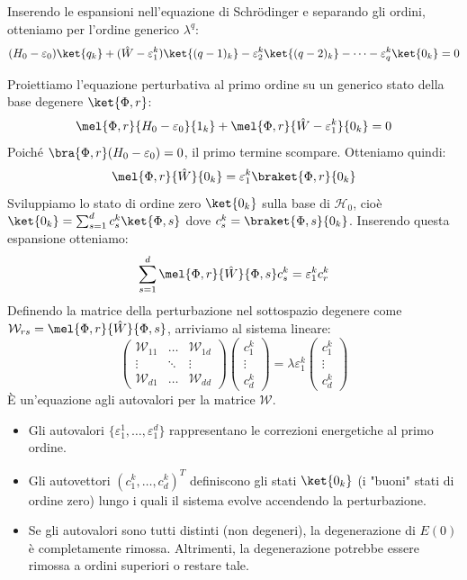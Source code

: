 Inserendo le espansioni nell'equazione di Schrödinger e separando gli ordini, otteniamo per l'ordine generico $\lambda^q$:
\[
    (H_0 - \varepsilon_0)\ket{q_k} + (\hat{W} - \varepsilon_1^k)\ket{(q-1)_k} - \varepsilon_2^k\ket{(q-2)_k} - \dots - \varepsilon_q^k \ket{0_k} = 0
\]

Proiettiamo l'equazione perturbativa al primo ordine su un generico stato della base degenere $\ket{\Phi, r}$:
\[
    \mel{\Phi,r}{H_0 - \varepsilon_0}{1_k} + \mel{\Phi,r}{\hat{W} - \varepsilon_1^k}{0_k} = 0
\]
Poiché $\bra{\Phi,r}(H_0 - \varepsilon_0) = 0$, il primo termine scompare. Otteniamo quindi:
\[
    \mel{\Phi,r}{\hat{W}}{0_k} = \varepsilon_1^k \braket{\Phi,r}{0_k}
\]
Sviluppiamo lo stato di ordine zero $\ket{0_k}$ sulla base di $\mathcal{H}_0$, cioè $\ket{0_k} = \sum_{s=1}^d c_s^k \ket{\Phi,s}$ dove $c_s^k = \braket{\Phi,s}{0_k}$. Inserendo questa espansione otteniamo:
\[
    \sum_{s=1}^d \mel{\Phi,r}{\hat{W}}{\Phi,s} c_s^k = \varepsilon_1^k c_r^k
\]
Definendo la matrice della perturbazione nel sottospazio degenere come $\mathcal{W}_{rs} = \mel{\Phi,r}{\hat{W}}{\Phi,s}$, arriviamo al sistema lineare:
\[
    \begin{pmatrix}
        \mathcal{W}_{11} & \dots & \mathcal{W}_{1d} \\
        \vdots & \ddots & \vdots \\
        \mathcal{W}_{d1} & \dots & \mathcal{W}_{dd}
    \end{pmatrix}
    \begin{pmatrix}
        c_1^k \\ \vdots \\ c_d^k
    \end{pmatrix}
    = \lambda \varepsilon_1^k
    \begin{pmatrix}
        c_1^k \\ \vdots \\ c_d^k
    \end{pmatrix}
\]
È un'equazione agli autovalori per la matrice $\mathcal{W}$.

\begin{itemize}
    \item Gli autovalori $\{\varepsilon_1^1, \dots, \varepsilon_1^d\}$ rappresentano le correzioni energetiche al primo ordine.
    \item Gli autovettori $(c_1^k, \dots, c_d^k)^T$ definiscono gli stati $\ket{0_k}$ (i "buoni" stati di ordine zero) lungo i quali il sistema evolve accendendo la perturbazione.
    \item Se gli autovalori sono tutti distinti (non degeneri), la degenerazione di $E(0)$ è completamente rimossa. Altrimenti, la degenerazione potrebbe essere rimossa a ordini superiori o restare tale.
\end{itemize}

